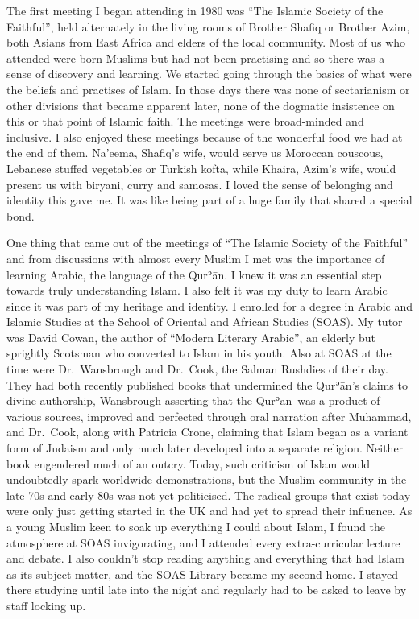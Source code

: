 \documentclass[12pt]{memoir}
\def\´{ʾ} %
\newcommand{\cor}[2]{#2} %
\def \Quran{Qur\-\´ān} %
\begin{document}
The first meeting I began attending in 1980 was
“The Islamic Society of the Faithful”,
held alternately in the living rooms of Brother Shafiq or Brother Azim,
both Asians from East Africa and elders of the local community.
Most of us who attended were born Muslims but had not been practising
and so there was a sense of discovery and learning.
We started going through the basics of what were the beliefs
and practises of Islam.
In those days there was none of \cor{the sectarian}{sectarianism}
or other divisions that became apparent later,
none of the dogmatic insistence on this or that point of Islamic faith.
The meetings were broad-minded and inclusive.
I also enjoyed these meetings because of the wonderful food
we had at the end of them.
Na’eema, Shafiq’s wife, would serve us Moroccan \cor{cous cous}{couscous},
Lebanese stuffed vegetables or Turkish kofta, while Khaira, Azim’s wife,
would present us with \cor{biriyani}{biryani}, curry and samosas.
I loved the sense of belonging and identity this gave me.
It was like being part of a huge family that shared a special bond.

One thing that came out of the meetings of
“The Islamic Society of the Faithful”
and from discussions with almost every Muslim I met
was the importance of learning Arabic, the language of the \Quran.
I knew it was an essential step towards truly understanding Islam.
I also felt it was my duty to learn Arabic
since it was part of my heritage and identity.
I enrolled for a degree in Arabic and Islamic Studies
at the School of Oriental and African Studies (SOAS).
My tutor was David Cowan, the author of “Modern Literary Arabic”,
an elderly but sprightly Scotsman who converted to Islam in his youth.
Also at SOAS at the time were Dr.\ Wansbrough and Dr.\ Cook,
the Salman Rushdies of their day.
They had both recently published books that undermined
the \Quran’s claims to divine authorship,
Wansbrough asserting that the \Quran\ was a product of various sources,
improved and perfected through oral narration after Muhammad,
and Dr.\ Cook, along with Patricia Crone,
claiming that Islam began as a variant form of Judaism
and only much later developed into a separate religion.
Neither book engendered much of an outcry.
Today, such criticism of Islam would undoubtedly
spark worldwide demonstrations,
but the Muslim community in the late 70s and early 80s was not yet politicised.
The radical groups that exist today were only just getting started in the UK
and had yet to spread their influence.
As a young Muslim keen to soak up everything I could about Islam,
I found the atmosphere at SOAS invigorating,
and I attended every extra-curricular lecture and debate.
I also couldn’t stop reading anything
and everything that had Islam as its subject matter,
and the SOAS Library became my second home.
I stayed there studying until late into the night
and regularly had to be asked to leave by staff locking up.
\end{document}

